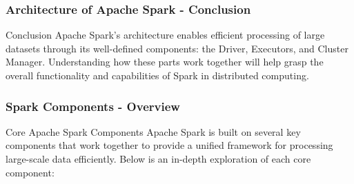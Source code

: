 \documentclass{beamer}
\begin{document}
\begin{frame}[fragile]
    \frametitle{Architecture of Apache Spark - Conclusion}
    \begin{block}{Conclusion}
        Apache Spark's architecture enables efficient processing of large datasets through its well-defined components: the Driver, Executors, and Cluster Manager.
        Understanding how these parts work together will help grasp the overall functionality and capabilities of Spark in distributed computing.
    \end{block}
\end{frame}

\begin{frame}
    \frametitle{Spark Components - Overview}
    \begin{block}{Core Apache Spark Components}
        Apache Spark is built on several key components that work together to provide a unified framework for processing large-scale data efficiently. Below is an in-depth exploration of each core component:
    \end{block}
\end{frame}
\end{document}
